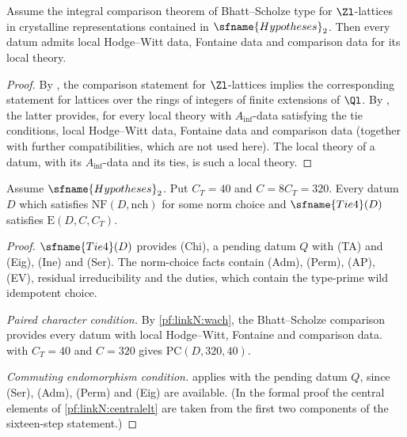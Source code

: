 \begin{lemma}\label{pf:linkN:wach}
Assume the integral comparison theorem of Bhatt--Scholze type for $\Zl$-lattices in crystalline representations contained in
$\sfname{Hypotheses}_2$. Then every datum admits local Hodge--Witt data, Fontaine data and comparison data for its local theory.
\end{lemma}

\begin{proof}
By , the comparison statement for $\Zl$-lattices implies the
corresponding statement for lattices over the rings of integers of finite extensions of $\Ql$. By
, the latter provides, for every local theory with $A_{\inf}$-data satisfying the tie
conditions, local Hodge--Witt data, Fontaine data and comparison data (together with further compatibilities, which are not used here). The
local theory of a datum, with its $A_{\inf}$-data and its ties, is such a local theory.
\end{proof}

\begin{theorem}\label{pf:linkN:extra}
Assume $\sfname{Hypotheses}_2$. Put $C_T=40$ and $C=8C_T=320$. Every datum $D$ which satisfies $\mathrm{NF}(D,\mathrm{nch})$ for some
norm choice and $\sfname{Tie4}(D)$ satisfies $\mathrm{E}(D,C,C_T)$.
\end{theorem}

\begin{proof}
$\sfname{Tie4}(D)$ provides (Chi), a pending datum $Q$ with (TA) and (Eig), (Ine) and (Ser). The norm-choice facts contain (Adm),
(Perm), (AP), (EV), residual irreducibility and the duties, which contain the type-prime wild idempotent choice.

\emph{Paired character condition.} By \cref{pf:linkN:wach}, the
Bhatt--Scholze comparison provides every datum with local Hodge--Witt, Fontaine and comparison data. 
with $C_T=40$ and $C=320$ gives $\mathrm{PC}(D,320,40)$.

\emph{Commuting endomorphism condition.}  applies with the pending datum $Q$, since (Ser), (Adm), (Perm) and
(Eig) are available. (In the formal proof the central elements of \cref{pf:linkN:centralelt} are taken from the first two
components of the sixteen-step statement.)
\end{proof}

